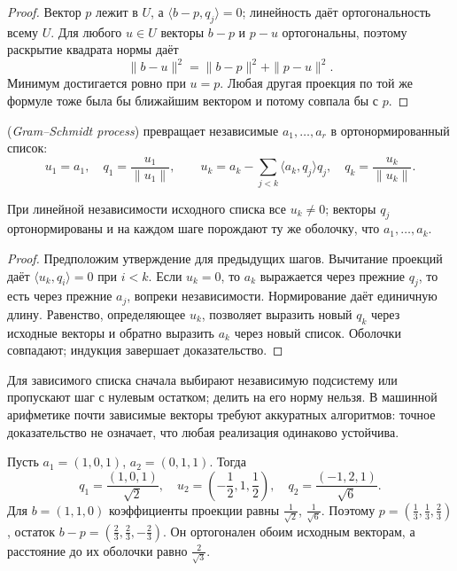 \begin{proof}Вектор \(p\) лежит в \(U\), а \(\langle b-p,q_j\rangle=0\); линейность даёт ортогональность всему \(U\). Для любого \(u\in U\) векторы \(b-p\) и \(p-u\) ортогональны, поэтому раскрытие квадрата нормы даёт
\[\|b-u\|^2=\|b-p\|^2+\|p-u\|^2.\]
Минимум достигается ровно при \(u=p\). Любая другая проекция по той же формуле тоже была бы ближайшим вектором и потому совпала бы с \(p\).\end{proof}
\begin{definition} (\emph{Gram--Schmidt process}) превращает независимые \(a_1,\ldots,a_r\) в ортонормированный список:
\[
u_1=a_1,\quad q_1=\frac{u_1}{\|u_1\|},\qquad
u_k=a_k-\sum_{j<k}\langle a_k,q_j\rangle q_j,\quad q_k=\frac{u_k}{\|u_k\|}.
\]
\end{definition}
\begin{theorem}
При линейной независимости исходного списка все \(u_k\ne0\); векторы \(q_j\) ортонормированы и на каждом шаге порождают ту же оболочку, что \(a_1,\ldots,a_k\).
\end{theorem}
\begin{proof}Предположим утверждение для предыдущих шагов. Вычитание проекций даёт \(\langle u_k,q_i\rangle=0\) при \(i<k\). Если \(u_k=0\), то \(a_k\) выражается через прежние \(q_j\), то есть через прежние \(a_j\), вопреки независимости. Нормирование даёт единичную длину. Равенство, определяющее \(u_k\), позволяет выразить новый \(q_k\) через исходные векторы и обратно выразить \(a_k\) через новый список. Оболочки совпадают; индукция завершает доказательство.\end{proof}
Для зависимого списка сначала выбирают независимую подсистему или пропускают шаг с нулевым остатком; делить на его норму нельзя. В машинной арифметике почти зависимые векторы требуют аккуратных алгоритмов: точное доказательство не означает, что любая реализация одинаково устойчива.
\begin{example}Пусть \(a_1=(1,0,1)\), \(a_2=(0,1,1)\). Тогда
\[
q_1=\frac{(1,0,1)}{\sqrt2},\quad u_2=(-\frac12,1,\frac12),\quad q_2=\frac{(-1,2,1)}{\sqrt6}.
\]
Для \(b=(1,1,0)\) коэффициенты проекции равны \(\frac1{\sqrt2}\), \(\frac1{\sqrt6}\). Поэтому \(p=(\frac13,\frac13,\frac23)\), остаток \(b-p=(\frac23,\frac23,-\frac23)\). Он ортогонален обоим исходным векторам, а расстояние до их оболочки равно \(\frac2{\sqrt3}\).\end{example}
